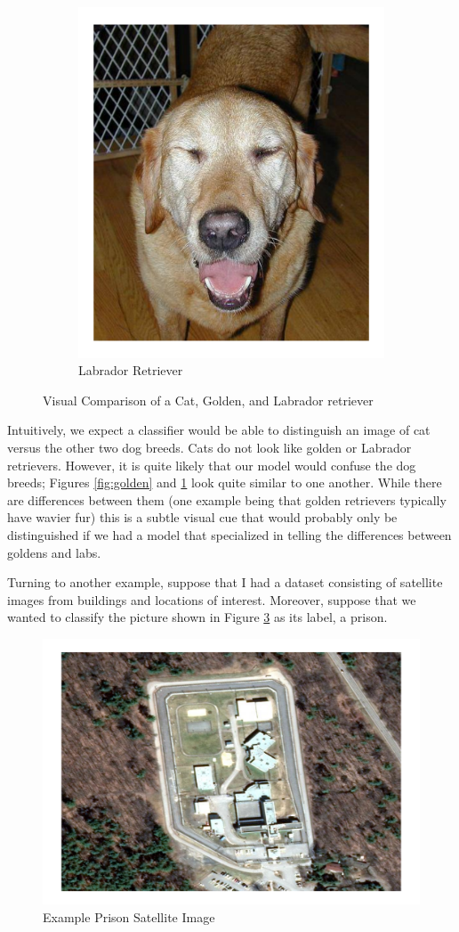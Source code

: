 \documentclass[draft, ../thesis.tex]{subfiles}
\begin{document}
\begin{figure}
\begin{subfigure}[b]{.3\linewidth}
    		\includegraphics[width=.7\linewidth]{images/lab}
    		\caption{Labrador Retriever}
    		\label{fig:lab}
    	\end{subfigure}
    	\caption{Visual Comparison of a Cat, Golden, and Labrador retriever}
    	\label{fig:animal_compare}
    \end{figure}
    
    Intuitively, we expect a classifier would be able to distinguish an image of cat versus the other two dog breeds. Cats do not look like golden or Labrador retrievers. However, it is quite likely that our model would confuse the dog breeds; Figures \ref{fig:golden} and \ref{fig:lab} look quite similar to one another. While there are differences between them (one example being that golden retrievers typically have wavier fur) this is a subtle visual cue that would probably only be distinguished if we had a model that specialized in telling the differences between goldens and labs.
    
    Turning to another example, suppose that I had a dataset consisting of satellite images from buildings and locations of interest. Moreover, suppose that we wanted to classify the picture shown in Figure \ref{fig:prison01rgb} as its label, a prison.
    
    \begin{figure}
    	\centering
    	\includegraphics[width=0.7\linewidth]{images/prison}
    	\caption{Example Prison Satellite Image}
    	\label{fig:prison01rgb}
    \end{figure}
    
\end{document}
